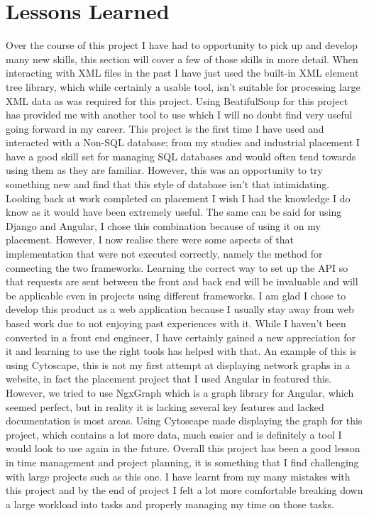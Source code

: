 \section{Lessons Learned}
Over the course of this project I have had to opportunity to pick up and develop many new skills, this section will cover 
a few of those skills in more detail. When interacting with XML files in the past I have just used the built-in XML element tree library, 
which while certainly a usable tool, isn't suitable for processing large XML data as was required for this project. Using BeatifulSoup 
for this project has provided me with another tool to use which I will no doubt find very useful going forward in my career. 
This project is the first time I have used and interacted with a Non-SQL database; from my studies and industrial placement 
I have a good skill set for managing SQL databases and would often tend towards using them as they are familiar. However, this was 
an opportunity to try something new and find that this style of database isn't that intimidating. Looking back at work completed 
on placement I wish I had the knowledge I do know as it would have been extremely useful. The same can be said for using Django and Angular, 
I chose this combination because of using it on my placement. However, I now realise there were some aspects of that implementation that were 
not executed correctly, namely the method for connecting the two frameworks. Learning the correct way to set up the API so that requests are sent 
between the front and back end will be invaluable and will be applicable even in projects using different frameworks. 
I am glad I chose to develop this product as a web application because I usually stay away from web based work due to not 
enjoying past experiences with it. While I haven't been converted in a front end engineer, I have certainly gained a new appreciation for it 
and learning to use the right tools has helped with that. An example of this is using Cytoscape, this is not my first attempt at displaying 
network graphs in a website, in fact the placement project that I used Angular in featured this. However, we tried to use NgxGraph which is 
a graph library for Angular, which seemed perfect, but in reality it is lacking several key features and lacked documentation is most areas. 
Using Cytoscape made displaying the graph for this project, which contains a lot more data, much easier and is definitely a tool I would 
look to use again in the future. Overall this project has been a good lesson in time management and project planning, it is something that I 
find challenging with large projects such as this one. I have learnt from my many mistakes with this project and by the end of project I felt 
a lot more comfortable breaking down a large workload into tasks and properly managing my time on those tasks.